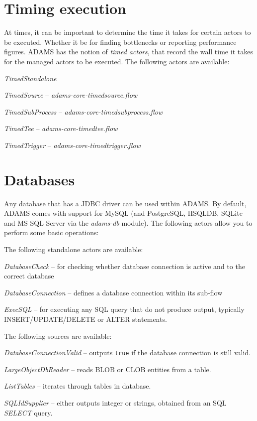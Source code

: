 \clearpage
\section{Timing execution}
At times, it can be important to determine the time it takes for certain actors to
be executed. Whether it be for finding bottlenecks or reporting performance figures.
ADAMS has the notion of \textit{timed actors}, that record the wall time it takes
for the managed actors to be executed. The following actors are available:
\begin{tight_itemize}
    \item \textit{TimedStandalone}
    \item \textit{TimedSource} -- \textit{adams-core-timedsource.flow}
    \item \textit{TimedSubProcess} -- \textit{adams-core-timedsubprocess.flow}
    \item \textit{TimedTee} -- \textit{adams-core-timedtee.flow}
    \item \textit{TimedTrigger} -- \textit{adams-core-timedtrigger.flow}
\end{tight_itemize}


\clearpage
\section{Databases}
Any database that has a JDBC driver can be used within ADAMS. By default,
ADAMS comes with support for MySQL (and PostgreSQL, HSQLDB, SQLite and MS SQL
Server via the \textit{adams-db} module). The following actors allow you to perform some basic operations:

\noindent The following standalone actors are available:
\begin{tight_itemize}
  \item \textit{DatabaseCheck} -- for checking whether database connection is active and to the correct database
  \item \textit{DatabaseConnection} -- defines a database connection within its sub-flow
  \item \textit{ExecSQL} -- for executing any SQL query that do not produce output, typically INSERT/UPDATE/DELETE
  or ALTER statements.
\end{tight_itemize}

\noindent The following sources are available:
\begin{tight_itemize}
  \item \textit{DatabaseConnectionValid} -- outputs \texttt{true} if the database connection is still valid.
  \item \textit{LargeObjectDbReader} -- reads BLOB or CLOB entities from a table.
  \item \textit{ListTables} -- iterates through tables in database.
  \item \textit{SQLIdSupplier} -- either outputs integer or strings, obtained from an SQL \textit{SELECT} query.
\end{tight_itemize}

